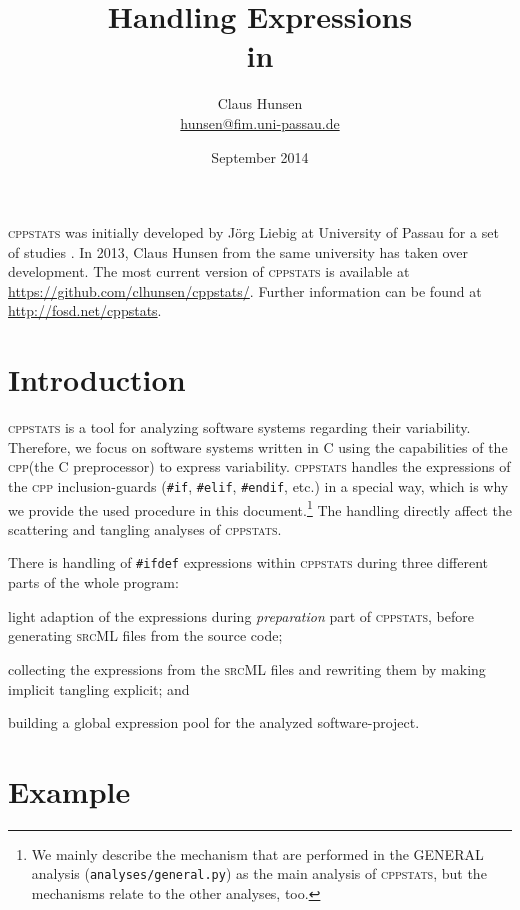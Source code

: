 \documentclass[a4paper]{scrartcl}
\title{Handling \ifdef Expressions\\in \cppstats}
\author{Claus Hunsen\\\url{hunsen@fim.uni-passau.de}}
\date{September 2014}
\newcommand\code[1]{\texttt{#1}}
\newcommand\tool[1]{\textsc{#1}}
\newcommand\ifdeff[1]{\code{\##1}\xspace}
\newcommand\ifdef[0]{{\upshape\ifdeff{ifdef}}\xspace}
\newcommand\cppstats[0]{\tool{cppstats}\xspace}
\newcommand\cpp{\tool{cpp}\xspace}
\begin{document}
\maketitle



\begin{footnotesize}
\noindent \cppstats was initially developed by J\"org Liebig at University of Passau for a set of studies \cite{LiebigALKS10,LiebigKA11}.
In 2013, Claus Hunsen from the same university has taken over development.
The most current version of \cppstats is available at \url{https://github.com/clhunsen/cppstats/}.
Further information can be found at \url{http://fosd.net/cppstats}.
\end{footnotesize}

\section{Introduction}
\cppstats is a tool for analyzing software systems regarding their variability.
Therefore, we focus on software systems written in \tool{C} using the capabilities of the \cpp (the \tool{C} preprocessor) to express variability.
\cppstats handles the expressions of the \cpp inclusion-guards (\ifdeff{if}, \ifdeff{elif}, \ifdeff{endif}, etc.) in a special way, which is why we provide the used procedure in this document.\footnote{We mainly describe the mechanism that are performed in the \tool{GENERAL} analysis (\code{analyses/general.py}) as the main analysis of \cppstats, but the mechanisms relate to the other analyses, too.}
The handling directly affect the scattering and tangling analyses of \cppstats.

There is handling of \ifdef expressions within \cppstats during three different parts of the whole program:
\begin{inparaenum}[\itshape 1\upshape)]
\item light adaption of the expressions during \textit{preparation} part of \cppstats, before generating \tool{srcML} files from the source code;
\item collecting the expressions from the \tool{srcML} files and rewriting them by making implicit tangling explicit; and
\item building a global expression pool for the analyzed software-project.
\end{inparaenum}



\section{Example}
\end{document}
